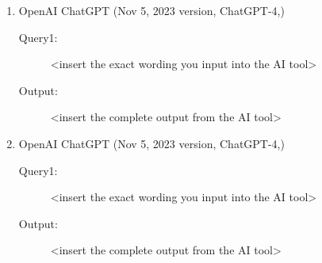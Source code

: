 \documentclass{mcmthesis}
\begin{document}
	\begin{enumerate}
		\item OpenAI ChatGPT (Nov 5, 2023 version, ChatGPT-4,) 
		\begin{description}
			\item[Query1:] <insert the exact wording you input into the AI tool> 
			\item[Output:] <insert the complete output from the AI tool>
		\end{description}
		
		\item OpenAI ChatGPT (Nov 5, 2023 version, ChatGPT-4,) 
		\begin{description}
			\item[Query1:] <insert the exact wording you input into the AI tool> 
			\item[Output:] <insert the complete output from the AI tool>
		\end{description}
		
	\end{enumerate}
	
	\clearpage
	\setcounter{page}{\value{lastpage}}
	
	
	
	
	
	
\end{document}
